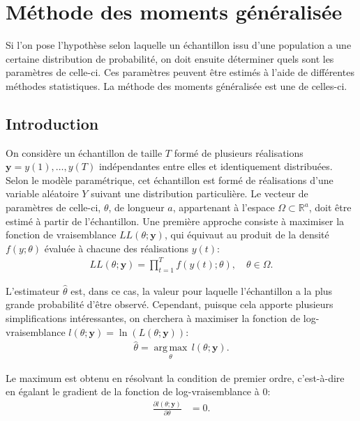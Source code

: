 \chapter{Méthode des moments généralisée} %

Si l'on pose l'hypothèse selon laquelle un échantillon issu d'une
population a une certaine distribution de probabilité, on doit
ensuite déterminer quels sont les paramètres de celle-ci. Ces
paramètres peuvent être estimés à l'aide de différentes méthodes
statistiques. La méthode des moments généralisée est une de celles-ci.

\section{Introduction}
\label{sec:intromethodeGMM}

On considère un échantillon de taille $T$ formé de plusieurs
réalisations $\mathbf{y} = y(1),\ldots,y(T)$ indépendantes entre elles
et identiquement distribuées. Selon le modèle paramétrique, cet
échantillon est formé de réalisations d'une variable aléatoire $Y$
suivant une distribution particulière. Le vecteur de paramètres de
celle-ci, $\theta$, de longueur $a$, appartenant à l'espace $\Omega
\subset \mathbb{R}^a$, doit être estimé à partir de l'échantillon. Une
première approche consiste à maximiser la fonction de vraisemblance
$LL(\theta;\mathbf{y})$, qui équivaut au produit de la densité
$f(y;\theta)$ évaluée à chacune des réalisations $y(t)$:
\begin{align}
  \label{eq:vraisemblance}
  LL(\theta;\mathbf{y}) = \prod_{t=1}^T
  f(y(t);\theta),\quad\theta\in\Omega.
\end{align}

L'estimateur $\hat\theta$ est, dans ce cas, la valeur pour
laquelle l'échantillon a la plus grande probabilité d'être
observé. Cependant, puisque cela apporte plusieurs simplifications
intéressantes, on cherchera à maximiser la fonction de
log-vraisemblance $l(\theta;\mathbf{y}) =
\ln{(L(\theta;\mathbf{y}))}$:
\begin{align}
  \label{eq:thetavraisemblance}
  \hat\theta = \underset{\theta}{\operatorname{arg\,max}} \,
  l(\theta;\mathbf{y}).
\end{align}

Le maximum est obtenu en résolvant la condition de premier ordre,
c'est-à-dire en égalant le gradient de la fonction de
log-vraisemblance à 0:
\begin{align}
  \label{eq:EEvraisemblance}
  \frac{\partial{l(\theta;\mathbf{y})}}{\partial{\theta}} &= 0.
\end{align}

